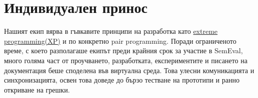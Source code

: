 \documentclass[12pt]{article}
\begin{document}
	\section{Индивидуален принос}
	
	Нашият екип вярва в гъвкавите принципи на разработка като  \href{https://asana.com/resources/extreme-programming-xp}{extreme programming(XP)} и по конкретно pair programming. Поради ограниченото време, с което разполагаше екипът преди крайния срок за участие в SemEval, много голяма част от проучването, разработката, експериментите и писането на документация беше споделена във виртуална среда. Това улесни комуникацията и синхронизацията, освен това доведе до бързо тестване на прототипи и ранно откриване на грешки.
	
\end{document}
